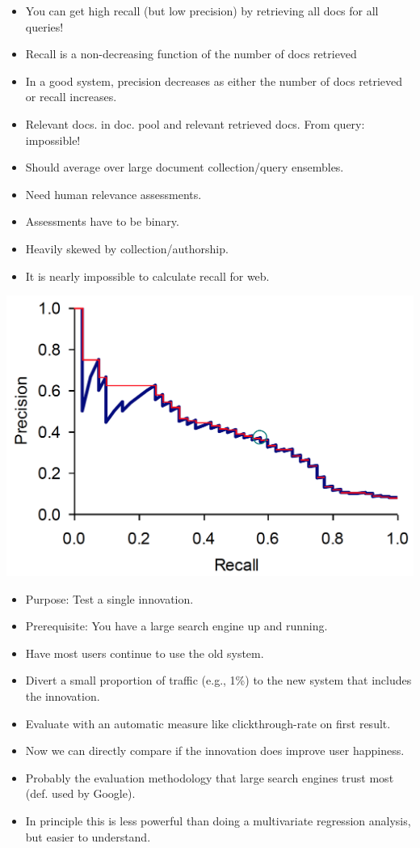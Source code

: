 \begin{breakbox}
\begin{itemize}
	\item You can get high recall (but low precision) by retrieving all docs for all queries!
	\item Recall is a non-decreasing function of the number of docs retrieved
	\item In a good system, precision decreases as either the number of docs retrieved or recall increases.
\end{itemize}
\end{breakbox}

\begin{breakbox}
\begin{itemize}
	\item Relevant docs. in doc. pool and relevant retrieved docs. From query: impossible!
	\item Should average over large document collection/query ensembles.
	\item Need human relevance assessments.
	\item Assessments have to be binary.
	\item Heavily skewed by collection/authorship.
	\item It is nearly impossible to calculate recall for web.
\end{itemize}
\end{breakbox}

\begin{breakbox}
\begin{center}
\includegraphics[width=.1\textwidth]{slides_images/precision_recall_curve}
\end{center}
\end{breakbox}

\begin{breakbox}
\begin{itemize}
	\item Purpose: Test a single innovation.
	\item Prerequisite: You have a large search engine up and running.
	\item Have most users continue to use the old system.
	\item Divert a small proportion of traffic (e.g., 1\%) to the new system that includes the innovation.
	\item Evaluate with an automatic measure like clickthrough-rate on first result.
	\item Now we can directly compare if the innovation does improve user happiness.
	\item Probably the evaluation methodology that large search engines trust most (def. used by Google).
	\item In principle this is less powerful than doing a multivariate regression analysis, but easier to understand.
\end{itemize}
\end{breakbox}

